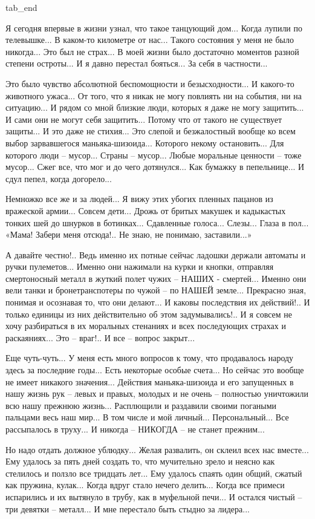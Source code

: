   tab_end
\fi

Я сегодня впервые в жизни узнал, что такое танцующий дом... Когда лупили по
телевышке... В каком-то километре от нас... Такого состояния у меня не было
никогда... Это был не страх... В моей жизни было достаточно моментов разной
степени остроты... И я давно перестал бояться... За себя в частности... 

Это было чувство абсолютной беспомощности и безысходности... И какого-то
животного ужаса... От того, что я никак не могу повлиять ни на события, ни на
ситуацию... И рядом со мной близкие люди, которых я даже не могу защитить... И
сами они не могут себя защитить... Потому что от такого не существует защиты...
И это даже не стихия... Это слепой и безжалостный вообще ко всем выбор
зарвавшегося маньяка-шизоида... Которого некому остановить... Для которого люди
– мусор... Страны – мусор... Любые моральные ценности – тоже мусор... Сжег все,
что мог и до чего дотянулся... Как бумажку в пепельнице... И сдул пепел, когда
догорело... 

Немножко все же и за людей... Я вижу этих убогих пленных пацанов из вражеской
армии... Совсем дети... Дрожь от бритых макушек и кадыкастых тонких шей до
шнурков в ботинках... Сдавленные голоса... Слезы... Глаза в пол... «Мама! Забери
меня отсюда!.. Не знаю, не понимаю, заставили...»

А давайте честно!.. Ведь именно их потные сейчас ладошки держали автоматы и
ручки пулеметов... Именно они нажимали на курки и кнопки, отправляя
смертоносный металл в жуткий полет чужих – НАШИХ - смертей... Именно они вели
танки и бронетранспотеры по чужой – по НАШЕЙ земле... Прекрасно зная, понимая
и осознавая то, что они делают... И каковы последствия их действий!.. И только
единицы из них действительно об этом задумывались!.. И я совсем не хочу
разбираться в их моральных стенаниях и всех последующих страхах и
раскаяниях... Это – враг!.. И все – вопрос закрыт...

Еще чуть-чуть... У меня есть много вопросов к тому, что продавалось народу
здесь за последние годы... Есть некоторые особые счета... Но сейчас это вообще
не имеет никакого значения... Действия маньяка-шизоида и его запущенных в нашу
жизнь рук – левых и правых, молодых и не очень – полностью уничтожили всю
нашу прежнюю жизнь... Расплющили и раздавили своими погаными пальцами весь наш
мир... В том числе и мой личный... Персональный... Все рассыпалось в труху... И
никогда – НИКОГДА – не станет прежним... 

Но надо отдать должное ублюдку... Желая развалить, он склеил всех нас вместе...
Ему удалось за пять дней создать то, что мучительно зрело и неясно как
стелилось и ползло все тридцать лет... Ему удалось спаять один общий, сжатый
как пружина, кулак... Когда вдруг стало нечего делить... Когда все примеси
испарились и их вытянуло в трубу, как в муфельной печи... И остался чистый –
три девятки – металл... И мне перестало быть стыдно за лидера... 


